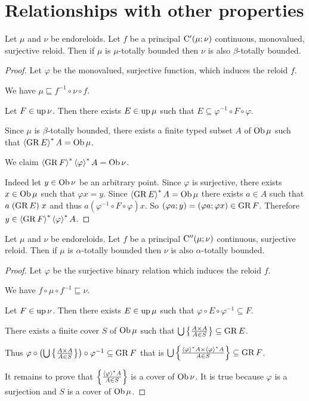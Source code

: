 \section{Relationships with other properties}
\begin{thm}
Let $\mu$ and $\nu$ be endoreloids. Let $f$ be a principal $\mathrm{C}'(\mu;\nu)$
continuous, monovalued, surjective reloid. Then if $\mu$ is $\mu$-totally
bounded then $\nu$ is also $\beta$-totally bounded.\end{thm}
\begin{proof}
Let $\varphi$ be the monovalued, surjective function, which induces
the reloid $f$.

We have $\mu\sqsubseteq f^{-1}\circ\nu\circ f$.

Let $F\in\operatorname{up}\nu$. Then there exists $E\in\operatorname{up}\mu$ such that $E\subseteq\varphi^{-1}\circ F\circ\varphi$.

Since $\mu$ is $\beta$-totally bounded, there exists a finite typed
subset $A$ of $\operatorname{Ob}\mu$ such that $\left\langle \operatorname{GR} E\right\rangle ^{\ast}A=\operatorname{Ob}\mu$.

We claim $\left\langle \operatorname{GR} F\right\rangle ^{\ast}\left\langle \varphi\right\rangle ^{\ast}A=\operatorname{Ob}\nu$.

Indeed let $y\in\operatorname{Ob}\nu$ be an arbitrary point. Since $\varphi$ is
surjective, there exists $x\in\operatorname{Ob}\mu$ such that $\varphi x=y$. Since
$\left\langle \operatorname{GR} E\right\rangle ^{\ast}A=\operatorname{Ob}\mu$ there exists $a\in A$ such that $a\mathrel{(\operatorname{GR} E)}x$
and thus $a\mathrel{(\varphi^{-1}\circ F\circ\varphi)}x$. So $(\varphi a;y)=(\varphi a;\varphi x)\in\operatorname{GR} F$.
Therefore $y\in\left\langle \operatorname{GR} F\right\rangle ^{\ast}\left\langle \varphi\right\rangle ^{\ast}A$.\end{proof}
\begin{thm}
Let $\mu$ and $\nu$ be endoreloids. Let $f$ be a principal $\mathrm{C}''(\mu;\nu)$
continuous, surjective reloid. Then if $\mu$ is $\alpha$-totally
bounded then $\nu$ is also $\alpha$-totally bounded.\end{thm}
\begin{proof}
Let $\varphi$ be the surjective binary relation which induces the
reloid $f$.

We have $f\circ\mu\circ f^{-1}\sqsubseteq\nu$.

Let $F\in\operatorname{up}\nu$. Then there exists $E\in\operatorname{up}\mu$ such that $\varphi\circ E\circ\varphi^{-1}\subseteq F$.

There exists a finite cover $S$ of $\operatorname{Ob}\mu$ such that $\bigcup\left\{ \frac{A\times A}{A\in S}\right\}\subseteq\operatorname{GR} E$.

Thus $\varphi\circ\left(\bigcup\left\{ \frac{A\times A}{A\in S}\right\}\right)\circ\varphi^{-1}\subseteq\operatorname{GR} F$
that is $\bigcup\left\{ \frac{\left\langle \varphi\right\rangle ^{\ast}A\times\left\langle \varphi\right\rangle ^{\ast}A}{A\in S}\right\}\subseteq\operatorname{GR} F$.

It remains to prove that $\left\{ \frac{\left\langle \varphi\right\rangle ^{\ast}A}{A\in S}\right\}$ is
a cover of $\operatorname{Ob}\nu$. It is true because $\varphi$ is a surjection
and $S$ is a cover of $\operatorname{Ob}\mu$.
\end{proof}

